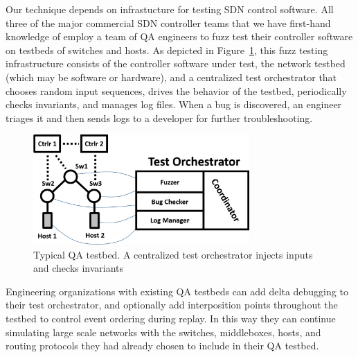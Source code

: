 
Our technique depends on infrastucture for testing SDN control software.
All three of the major commercial SDN controller teams that we have first-hand knowledge of employ a team of QA
engineers to fuzz test their controller software on testbeds of switches and hosts.
As depicted in Figure~\ref{fig:qa_cluster}, this fuzz testing infrastructure
consists of the controller software under test, the network testbed (which may
be software or hardware), and a centralized
test orchestrator
that chooses random input sequences, drives the behavior of the testbed,
periodically checks invariants, and manages log files. When a bug is discovered, an
engineer triages it and then sends logs to a developer for further troubleshooting.

\begin{figure}[tb]
    \includegraphics[width=3.25in]{../diagrams/architecture/qa_cluster.png}
    \caption[]{\label{fig:qa_cluster} Typical QA testbed. A centralized test
    orchestrator injects inputs and checks invariants}
\end{figure}

Engineering organizations with existing
QA testbeds can add delta debugging to their test
orchestrator, and optionally add interposition points throughout the
testbed to control event ordering during replay.
In this way they can continue simulating large scale networks with
the switches, middleboxes, hosts, and routing protocols they had already
chosen to include in their QA testbed.

